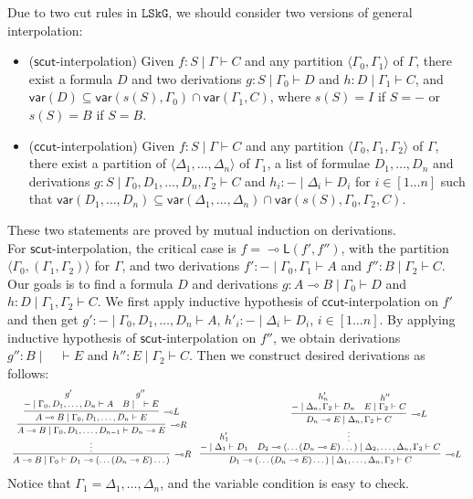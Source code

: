 \documentclass[a4paper,UKenglish,cleveref, autoref, thm-restate, anonymous]{lipics-v2021}
\newcommand{\GG}{\Gamma}
\newcommand{\GD}{\Delta}
\newcommand{\lolli}{\multimap}
\newcommand{\lleft}{{\lolli}\mathsf{L}}
\newcommand{\lright}{{\lolli}\mathsf{R}}
\newcommand{\vdG}{\vdash}
\newcommand{\LSkG}{$\mathtt{LSkG}$}
\newcommand{\mf}[1]{\mathsf{#1}}
\newcommand{\vars}[1]{\mathsf{var}(#1)}
\begin{document}
Due to two cut rules in \LSkG, we should consider two versions of general interpolation:
\begin{itemize}
  \item[\ ] ($\mf{scut}$-interpolation) Given $f: S \mid \Gamma \vdG C$ and any partition $\langle \GG_0,\GG_1 \rangle$ of $\GG$, there exist a formula $D$ and two derivations $g : S \mid \GG_0 \vdG D$ and $h : D \mid \GG_1 \vdG C$, and $\vars{D} \subseteq \vars{s(S), \GG_0} \cap \vars{\GG_1, C}$, where $s(S) = I$ if $S = {-}$ or $s(S) = B$ if $S = B$.
  \item[\ ] ($\mf{ccut}$-interpolation) Given $f: S \mid \Gamma \vdG C$ and any partition $\langle \GG_0,\GG_1, \GG_2 \rangle$ of $\GG$, there exist a partition of $\langle \GD_1, \dots, \GD_n \rangle$ of $\GG_1$, a list of formulae $D_1, \dots, D_n$ and derivations $g: S \mid \GG_0, D_1, \dots, D_n, \GG_2 \vdG C$ and $h_i : {-} \mid \GD_i \vdG D_i$ for $i \in [1\dots n]$ such that $\vars{D_1, \dots, D_n} \subseteq \vars{\GD_1, \dots, \GD_n} \cap \vars{s(S), \GG_0, \GG_2, C}$.
\end{itemize}
These two statements are proved by mutual induction on derivations.
\\
For $\mf{scut}$-interpolation, the critical case is $f = \lleft (f',f'')$, with the partition $\langle \GG_0, (\GG_1, \GG_2) \rangle$ for $\GG$, and two derivations $f' : {-} \mid \GG_0, \GG_1 \vdG A$ and $f'': B \mid \GG_2 \vdG C$.
Our goals is to find a formula $D$ and derivations $g : A\lolli B \mid \GG_0 \vdG D$ and $h: D \mid \GG_1, \GG_2 \vdG C$.
We first apply inductive hypothesis of $\mf{ccut}$-interpolation on $f'$ and then get $g': {-} \mid \GG_0 , D_1, \dots, D_n \vdG A$, $h'_i : {-} \mid \GD_i \vdG D_i$, $i \in [1\dots n]$.
By applying inductive hypothesis of $\mf{scut}$-interpolation on $f''$, we obtain derivations $g'' : B \mid \quad \vdG E$ and $h'': E \mid \GG_2 \vdG C$.
Then we construct desired derivations as follows:
\begin{displaymath}
  \small\begin{array}{c}
    \infer[\lright]{A\lolli B \mid \GG_0 \vdG D_1 \lolli (\dots (D_n \lolli E)\dots)}{
      \deduce{\vdots}{
        \infer[\lright]{A \lolli B \mid \GG_0 , D_1, \dots ,D_{n-1} \vdG D_n \lolli E}{
        \infer[\lleft]{A \lolli B \mid \GG_0 , D_1, \dots, D_n \vdG E}{
          \deduce{{-} \mid \GG_0 , D_1, \dots, D_n \vdG A}{g'}
          &
          \deduce{B \mid \quad \vdG E}{g''}
        }
      }
      }
    }
    \quad
    \infer[\lleft]{D_1 \lolli (\dots (D_n \lolli E)\dots) \mid \GD_1, \dots, \GD_n, \GG_2 \vdG C}{
      \deduce{{-} \mid \GD_1 \vdG D_1}{h'_1}
      &
      \deduce{D_2 \lolli (\dots (D_n \lolli E)\dots) \mid \GD_2, \dots, \GD_n, \GG_2 \vdG C}{
        \deduce{\vdots}{
          \infer[\lleft]{D_n \lolli E \mid \GD_n, \GG_2 \vdG C}{
            \deduce{{-} \mid \GD_n, \GG_2 \vdG D_n}{h'_n}
            &
            \deduce{E \mid \GG_2 \vdG C}{h''}
          }
        }
      }
    }
  \end{array}
\end{displaymath}
Notice that $\GG_1 = \GD_1, \dots, \GD_n$, and the variable condition is easy to check.
\end{document}
